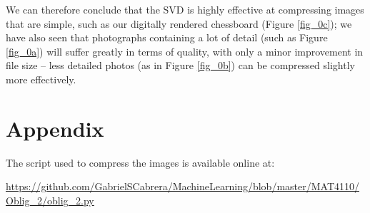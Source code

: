 \documentclass[a4paper,10pt,english]{article}
\begin{document}
We can therefore conclude that the SVD is highly effective at compressing images that are simple, such as our digitally rendered chessboard (Figure \ref{fig_0c}); we have also seen that photographs containing a lot of detail (such as Figure \ref{fig_0a}) will suffer greatly in terms of quality, with only a minor improvement in file size – less detailed photos (as in Figure \ref{fig_0b}) can be compressed slightly more effectively.

\section*{Appendix}

The script used to compress the images is available online at:

\url{https://github.com/GabrielSCabrera/MachineLearning/blob/master/MAT4110/Oblig\_2/oblig\_2.py}
\end{document}

